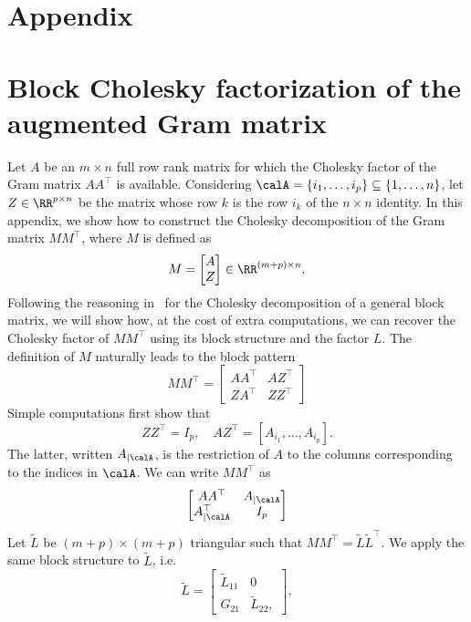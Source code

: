 \section*{Appendix}

\appendix

\section{Block Cholesky factorization of the augmented Gram matrix}\label{appendix:chol_aug_matrix}
Let $A$ be an $m \times n$ full row rank matrix for which the Cholesky factor of the Gram matrix $AA^\top$ is available. Considering $\calA = \left\{i_1,\ldots, i_p\right\} \subseteq \{1,\ldots,n\}$, let $Z \in \RR^{p\times n}$ be the matrix whose row $k$ is the row $i_k$ of the $n\times n$ identity.
In this appendix, we show how to construct the Cholesky decomposition of the Gram matrix $MM^\top$, where $M$ is defined as
\[M = \begin{bmatrix}
	A \\ Z
\end{bmatrix} \in \RR^{(m+p)\times n}.\]  
Following the reasoning in~\cite[][section 4.2.9]{golubvanloan:2013} for the Cholesky decomposition of a general block matrix, we will show how, at the cost of extra computations, we can recover the Cholesky factor of $MM^\top$ using its block structure and the factor $L$. The definition of $M$ naturally leads to the block pattern
\[MM^\top = \begin{bmatrix}
	AA^\top & AZ^\top \\ ZA^\top & ZZ^\top
\end{bmatrix}\]
Simple computations first show that 
\[ZZ^\top = I_p,\quad AZ^\top = [A_{i_1},\ldots,A_{i_p}].\]
The latter, written $A_{|\calA}$, is the restriction of $A$ to the columns corresponding to the indices in $\calA$. We can write $MM^\top$ as 
\begin{equation}\label{eq:augmented_grammat}
	\begin{bmatrix}
		AA^\top &  A_{|\calA} \\  A_{|\calA}^\top & I_p
	\end{bmatrix}
\end{equation}
Let $\tilde{L}$ be $(m+p)\times(m+p)$ triangular such that $MM^\top=\tilde{L}\tilde{L}^\top$. We apply the same block structure to $\tilde{L}$, i.e.
\[\tilde{L} = \begin{bmatrix}
	\tilde{L}_{11} & 0 \\ G_{21} & \tilde{L}_{22},
\end{bmatrix},\]
